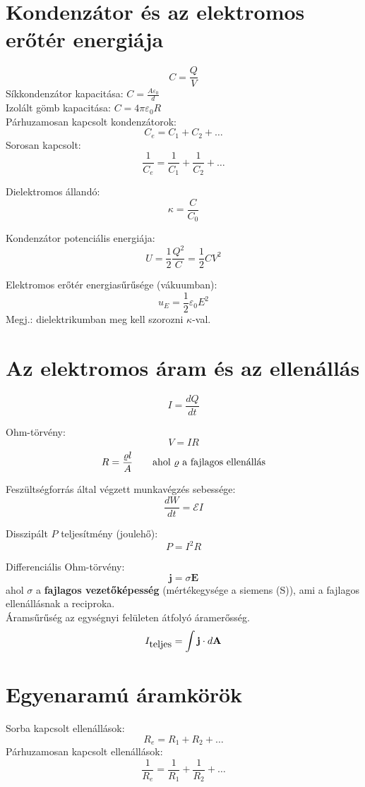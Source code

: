 \documentclass[12pt,a4paper,twocolumn]{article}
\begin{document}
  \section{Kondenzátor és az elektromos erőtér energiája}
  
  \[C = \frac{Q}{V}\]
  Síkkondenzátor kapacitása: $\displaystyle C = \frac{A\varepsilon_0}{d}$\\
  Izolált gömb kapacitása: $C = 4\pi\varepsilon_0 R$\\
  
  Párhuzamosan kapcsolt kondenzátorok:
  \[C_e = C_1 + C_2 + \ldots\]
  Sorosan kapcsolt:
  \[\frac{1}{C_e} = \frac{1}{C_1} + \frac{1}{C_2} + \ldots\]
  
  Dielektromos állandó:
  \[\kappa = \frac{C}{C_0}\]
  
  Kondenzátor potenciális energiája:
  \[U = \frac{1}{2} \frac{Q^2}{C} = \frac{1}{2} CV^2\]
  
  Elektromos erőtér energiasűrűsége (vákuumban):
  \[u_E = \frac{1}{2} \varepsilon_0 E^2\]
  Megj.: dielektrikumban meg kell szorozni $\kappa$-val.
  
  \section{Az elektromos áram és az ellenállás}
  
  \[I = \frac{dQ}{dt}\]
  
  Ohm-törvény:
  \[V = IR\]
  \[R = \frac{\varrho l}{A} \qquad \hbox{ahol $\varrho$ a fajlagos ellenállás}\]
  
  Feszültségforrás által végzett munkavégzés sebessége:
  \[\frac{dW}{dt} = \mathcal{E}I\]
  
  Disszipált $P$ teljesítmény (joulehő):
  \[P = I^2 R\]
  
  Differenciális Ohm-törvény:
  \[\mathbf{j} = \sigma \mathbf{E}\]
  ahol $\sigma$ a \textbf{fajlagos vezetőképesség} (mértékegysége a siemens (S)), ami a fajlagos ellenállásnak a reciproka.\\
  
  Áramsűrűség az egységnyi felületen átfolyó áramerősség.
  \[I_{\hbox{teljes}} = \int \mathbf{j}\cdot d\mathbf{A}\]
  
  \section{Egyenaramú áramkörök}
  
  Sorba kapcsolt ellenállások:
  \[R_e = R_1 + R_2 + \ldots\]
  Párhuzamosan kapcsolt ellenállások:
  \[\frac{1}{R_e} = \frac{1}{R_1} + \frac{1}{R_2} + \ldots\]
  
\end{document}
